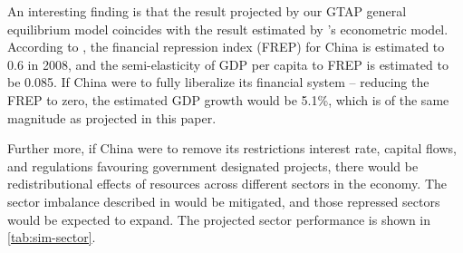 \documentclass[AER]{AEA}
\begin{document}
An interesting finding is that the result projected by our GTAP general 
equilibrium model coincides with the result estimated by 
\citeauthor{huang2011}'s econometric model. 
According to \cite{huang2011},  the financial repression index (FREP) 
for China is estimated to 0.6 in 2008, and the semi-elasticity of 
GDP per capita to FREP is estimated to be 0.085.  
If China were to fully liberalize its financial system -- reducing the 
FREP to zero, the estimated GDP growth would be 5.1\%, 
which is of the same magnitude as projected in this paper. 

Further more, if China were to remove its restrictions interest rate, capital flows, 
and regulations favouring government designated projects, there would be 
redistributional effects of resources across different sectors in the 
economy. The sector imbalance described in  would 
be mitigated, and those repressed sectors would be expected to expand.
The projected sector performance is shown in \autoref{tab:sim-sector}.
\end{document}
